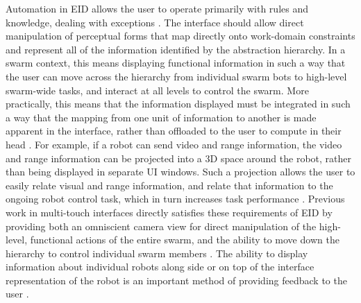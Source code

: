 Automation in EID allows the user to operate primarily with rules and knowledge, dealing with exceptions \citep{vicente2002ecological}.
The interface should allow direct manipulation of perceptual forms that map directly onto work-domain constraints and represent all of the information identified by the abstraction hierarchy. 
In a swarm context, this means displaying functional information in such a way that the user can move across the hierarchy from individual swarm bots to high-level swarm-wide tasks, and interact at all levels to control the swarm. 
More practically, this means that the information displayed must be integrated in such a way that the mapping from one unit of information to another is made apparent in the interface, rather than offloaded to the user to compute in their head \citep{yanco2004beyond}. 
For example, if a robot can send video and range information, the video and range information can be projected into a 3D space around the robot, rather than being displayed in separate UI windows.
Such a projection allows the user to easily relate visual and range information, and relate that information to the ongoing robot control task, which in turn increases task performance \citep{ricks2004ecological}.
Previous work in multi-touch interfaces directly satisfies these requirements of EID by providing both an omniscient camera view for direct manipulation of the high-level, functional actions of the entire swarm, and the ability to move down the hierarchy to control individual swarm members \citep{Micire:2009:ANG:1731903.1731912}.
The ability to display information about individual robots along side or on top of the interface representation of the robot is an important method of providing feedback to the user \citep{Kato:2009:MIC:1520340.1520500}. 

